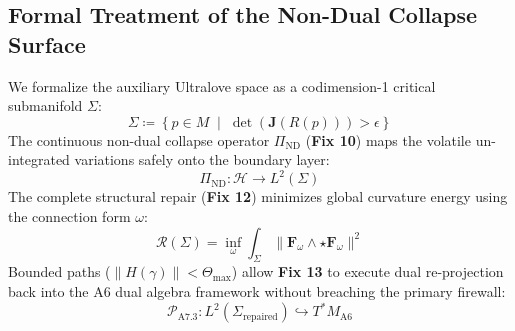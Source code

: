 \documentclass[11pt]{article}
\begin{document}
\subsection{Formal Treatment of the Non-Dual Collapse Surface}
We formalize the auxiliary Ultralove space as a codimension-1 critical submanifold $\Sigma$:
\begin{equation}
\Sigma \coloneqq \left\{ p \in M \;\middle\vert\; \det\left(\mathbf{J}\left(R(p)\right)\right) > \epsilon \right\}
\end{equation}
The continuous non-dual collapse operator $\Pi_{\text{ND}}$ (\textbf{Fix 10}) maps the volatile un-integrated variations safely onto the boundary layer:
\begin{equation}
\Pi_{\text{ND}} : \mathcal{H} \to L^2(\Sigma)
\end{equation}
The complete structural repair (\textbf{Fix 12}) minimizes global curvature energy using the connection form $\omega$:
\begin{equation}
\mathcal{R}(\Sigma) = \inf_{\omega} \int_{\Sigma} \| \mathbf{F}_\omega \wedge \star \mathbf{F}_\omega \|^2
\end{equation}
Bounded paths ($\|H(\gamma)\| < \Theta_{\max}$) allow \textbf{Fix 13} to execute dual re-projection back into the A6 dual algebra framework without breaching the primary firewall:
\begin{equation}
\mathcal{P}_{\text{A7.3}} : L^2(\Sigma_{\text{repaired}}) \hookrightarrow T^*M_{\text{A6}}
\end{equation}
\end{document}
